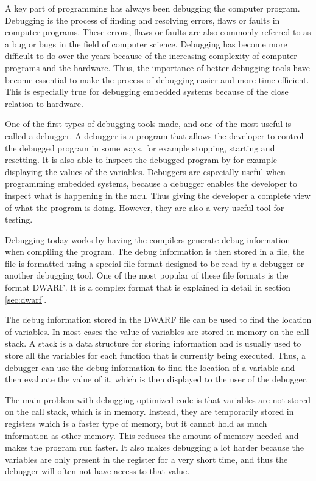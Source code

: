 
A key part of programming has always been debugging the computer program.
Debugging is the process of finding and resolving errors, flaws or faults in computer programs.
These errors, flaws or faults are also commonly referred to as a bug or bugs in the field of computer science.
Debugging has become more difficult to do over the years because of the increasing complexity of computer programs and the hardware.
Thus, the importance of better debugging tools have become essential to make the process of debugging easier and more time efficient.
This is especially true for debugging  embedded systems because of the close relation to hardware.


One of the first types of debugging tools made, and one of the most useful is called a debugger.
A debugger is a program that allows the developer to control the debugged program in some ways, for example stopping, starting and resetting.
It is also able to inspect the debugged program by for example displaying the values of the variables.
Debuggers are especially useful when programming embedded systems, because a debugger enables the developer to inspect what is happening in the \gls{mcu}.
Thus giving the developer a complete view of what the program is doing.
However, they are also a very useful tool for testing.


Debugging today works by having the compilers generate debug information when compiling the program.
The debug information is then stored in a file, the file is formatted using a special file format designed to be read by a debugger or another debugging tool.
One of the most popular of these file formats is the format \gls{DWARF}.
It is a complex format that is explained in detail in section \ref{sec:dwarf}.


The debug information stored in the \gls{DWARF} file can be used to find the location of variables.
In most cases the value of variables are stored in memory on the call stack.
A stack is a data structure for storing information and is usually used to store all the variables for each function that is currently being executed.
Thus, a debugger can use the debug information to find the location of a variable and then evaluate the value of it, which is then displayed to the user of the debugger.


The main problem with debugging optimized code is that variables are not stored on the call stack, which is in memory.
Instead, they are temporarily stored in registers which is a faster type of memory, but it cannot hold as much information as other memory.
This reduces the amount of memory needed and makes the program run faster.
It also makes debugging a lot harder because the variables are only present in the register for a very short time, and thus the debugger will often not have access to that value.




